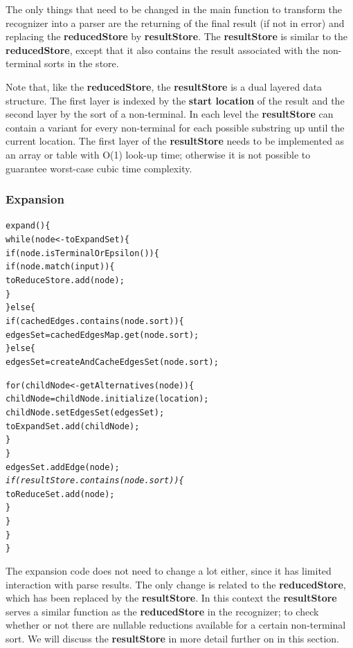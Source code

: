 \documentclass[a4paper,10pt]{article}
\begin{document}
The only things that need to be changed in the main function to transform the recognizer into a parser are the returning of the final result (if not in error) and replacing the {\bf reducedStore} by {\bf resultStore}. The {\bf resultStore} is similar to the {\bf reducedStore}, except that it also contains the result associated with the non-terminal sorts in the store.

Note that, like the {\bf reducedStore}, the {\bf resultStore} is a dual layered data structure. The first layer is indexed by the {\bf start location} of the result and the second layer by the sort of a non-terminal. In each level the {\bf resultStore} can contain a variant for every non-terminal for each possible substring up until the current location. The first layer of the {\bf resultStore} needs to be implemented as an array or table with O(1) look-up time; otherwise it is not possible to guarantee worst-case cubic time complexity.

\pagebreak
\subsubsection{Expansion}
{\small
\begin{alltt}
expand()\{
  while(node <- toExpandSet)\{
    if(node.isTerminalOrEpsilon())\{
      if(node.match(input))\{
        toReduceStore.add(node);
      \}
    \}else\{
      if(cachedEdges.contains(node.sort))\{
        edgesSet = cachedEdgesMap.get(node.sort);
      \}else\{
        edgesSet = createAndCacheEdgesSet(node.sort);
        
        for(childNode <- getAlternatives(node))\{
          childNode = childNode.initialize(location);
          childNode.setEdgesSet(edgesSet);
          toExpandSet.add(childNode);
        \}
      \}
      edgesSet.addEdge(node);
      \textit{
      if(resultStore.contains(node.sort))\{}
        toReduceSet.add(node);
      \}
    \}
  \}
\}
\end{alltt}
}

The expansion code does not need to change a lot either, since it has limited interaction with parse results. The only change is related to the {\bf reducedStore}, which has been replaced by the {\bf resultStore}. In this context the {\bf resultStore} serves a similar function as the {\bf reducedStore} in the recognizer; to check whether or not there are nullable reductions available for a certain non-terminal sort. We will discuss the {\bf resultStore} in more detail further on in this section.
\end{document}
